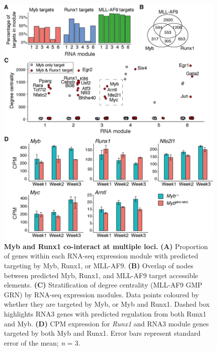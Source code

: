 \begin{figure}[htbp]
    \centering
    \includegraphics[width=\textwidth,height=\textheight,keepaspectratio]{figures/chapter5/ch5_myb-runx1.png}
    \caption[{Myb and Runx1 co-interact at multiple loci.}]
    {\textbf{Myb and Runx1 co-interact at multiple loci.}
    \textbf{(A)} Proportion of genes within each RNA-seq expression module with predicted targeting by Myb, Runx1, or MLL-AF9. 
    \textbf{(B)} Overlap of nodes between predicted Myb, Runx1, and MLL-AF9 target accessible elements. 
    \textbf{(C)} Stratification of degree centrality (MLL-AF9 GMP GRN) by RNA-seq expression modules. Data points coloured by whether they are targeted by Myb, or Myb and Runx1. Dashed box highlights RNA3 genes with predicted regulation from both Runx1 and Myb.
    \textbf{(D)} CPM expression for \textit{Runx1} and RNA3 module genes targeted by both Myb and Runx1. Error bars represent standard error of the mean; \textit{n} = 3. 
    }
    \label{fig:ch5_myb-runx1}
\end{figure}

